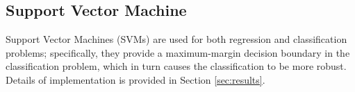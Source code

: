 \documentclass[8pt,conference,compsocconf]{IEEEtran}
\begin{document}
\subsection{Support Vector Machine}
Support Vector Machines (SVMs) are used for both regression and classification problems; specifically, they provide a maximum-margin decision boundary in the classification problem, which in turn causes the classification to be more robust. Details of implementation is provided in Section \ref{sec:results}.
\end{document}
